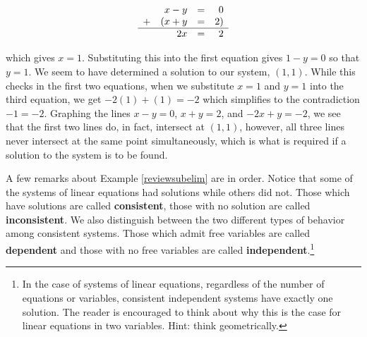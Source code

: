 \documentclass{ximera}
\begin{document}
\begin{example}
\begin{explanation}
\begin{enumerate}
\[ \begin{array}{lrcr} & x - y & = & 0  \\ + & (x + y & = & 2 ) \\ \hline  & 2x & = & 2 \end{array}\]  


which gives $x = 1$.  Substituting this into the first equation gives $1 - y = 0$ so that $y = 1$.  We seem to have determined a solution to our system, $(1,1)$.  While this checks in the first two equations, when we substitute $x=1$ and $y=1$ into the third equation, we get $-2(1) + (1) = -2$ which simplifies to the contradiction $-1 = -2$.  Graphing the lines $x-y=0$, $x+y = 2$, and $-2x+y=-2$, we see that the first two lines do, in fact, intersect at $(1,1)$, however, all three lines never intersect at the same point simultaneously, which is what is required if a solution to the system is to be found.

\begin{center}
\end{center}

\end{enumerate}
\end{explanation}
\end{example}

A few remarks about Example \ref{reviewsubelim} are in order.  Notice that some of the systems of linear equations had solutions while others did not.  Those which have solutions are called \textbf{consistent}, those with no solution are called \textbf{inconsistent}.  We also distinguish between the two different types of behavior among consistent systems. Those which admit free variables are called \textbf{dependent} and those with no free variables are called \textbf{independent}.\footnote{In the case of systems of linear equations, regardless of the number of equations or variables, consistent independent systems have exactly one solution.  The reader is encouraged to think about why this is the case for linear equations in two variables.  Hint: think geometrically.}   

 
\end{document}

